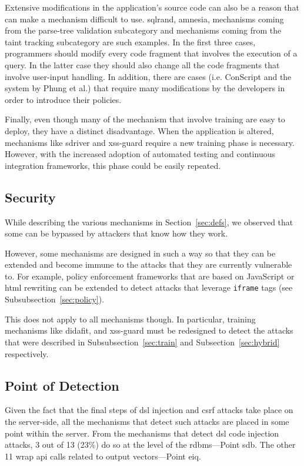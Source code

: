 \documentclass[conference]{IEEEtran}
\begin{document}
Extensive modifications in the application's source
code can also be a reason that can make a mechanism
difficult to use. {\sc sql}rand, {\sc amnesia},
mechanisms coming from the parse-tree validation
subcategory and mechanisms coming from the taint tracking
subcategory are such examples.
In the first three cases, programmers should modify every
code fragment that involves the execution of a query.
In the latter case they should also change
all the code fragments that involve user-input handling. 
In addition, there are cases (i.e. ConScript and the system
by Phung et al.) that require many modifications
by the developers in order to introduce their policies.

Finally, even though many of the mechanism that involve
training are easy to deploy, they have a distinct disadvantage.
When the application is altered, mechanisms like {\sc sd}river
and {\sc xss-guard} require a new training phase is necessary.
However, with the increased adoption of automated testing
and continuous integration frameworks, this phase could be
easily repeated.

\subsection{Security}

While describing the various mechanisms in
Section~\ref{sec:defs}, we observed that some
can be bypassed by attackers that know how they
work.

However, some mechanisms are designed in such a way
so that they can be extended and become immune to
the attacks that they are currently vulnerable to. For
example, policy enforcement frameworks that are
based on JavaScript or {\sc html} rewriting
can be extended to detect attacks that leverage
{\tt iframe} tags (see Subsubsection~\ref{sec:policy}).

This does not apply to all mechanisms though.
In particular, training mechanisms like {\sc didafit},
and {\sc xss-guard} must be redesigned
to detect the attacks that were described in
Subsubsection~\ref{sec:train} and
Subsection~\ref{sec:hybrid} respectively.

\subsection{Point of Detection}

Given the fact that the final steps of
{\sc dsl} injection and {\sc csrf} attacks take place
on the server-side, all the mechanisms that detect
such attacks are placed in some point within the server.
From the mechanisms that detect {\sc dsl} code injection
attacks, 3 out of 13 (23\%) do so at the level
of the {\sc rdbms}---Point {\sc sdb}.
The other 11 wrap {\sc api} calls related to output
vectors---Point {\sc e}i{\sc q}.
\end{document}
